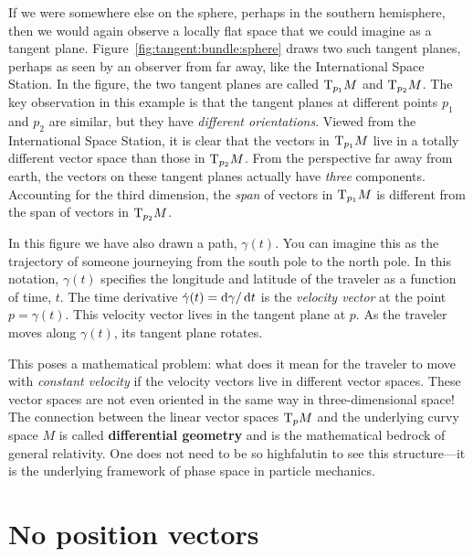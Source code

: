 \documentclass[12pt, oneside]{report}    %
\let\oldsection\section
\def\section{%
  \setcounter{sidenote}{1}%
  \oldsection
}
\begin{document}
If we were somewhere else on the sphere, perhaps in the southern hemisphere, then we would again observe a locally flat space that we could imagine as a tangent plane. Figure~\ref{fig:tangent:bundle:sphere} draws two such tangent planes, perhaps as seen by an observer from far away, like the International Space Station. In the figure, the two tangent planes are called $\textnormal{T}_{p_1}M$ and $\textnormal{T}_{p_2}M$. The key observation in this example is that the tangent planes at different points $p_1$ and $p_2$ are similar, but they have \emph{different orientations}. Viewed from the International Space Station, it is clear that the vectors in $\textnormal{T}_{p_1}M$ live in a totally different vector space than those in $\textnormal{T}_{p_2}M$. From the perspective far away from earth, the vectors on these tangent planes actually have \emph{three} components. Accounting for the third dimension, the \emph{span} of vectors in $\textnormal{T}_{p_1}M$ is different from the span of vectors in $\textnormal{T}_{p_2}M$.


In this figure we have also drawn a path, $\gamma(t)$. You can imagine this as the trajectory of someone journeying from the south pole to the north pole. In this notation, $\gamma(t)$ specifies the longitude and latitude of the traveler as a function of time, $t$. The time derivative $\dot\gamma(t)=\operatorname{d}\!{\gamma}/\operatorname{d}\!{t}$ is the \emph{velocity vector} at the point $p=\gamma(t)$. This velocity vector lives in the tangent plane at $p$. As the traveler moves along $\gamma(t)$, its tangent plane rotates. 

This poses a mathematical problem: what does it mean for the traveler to move with \emph{constant velocity} if the velocity vectors live in different vector spaces. These vector spaces are not even oriented in the same way in three-dimensional space! The connection between the linear vector spaces $\textnormal{T}_pM$ and the underlying curvy space $M$ is called \textbf{differential geometry} and is the mathematical bedrock of general relativity. One does not need to be so highfalutin to see this structure---it is the underlying framework of phase space in particle mechanics. 



\section{No position vectors}\label{sec:no:position:vectors}
\end{document}
